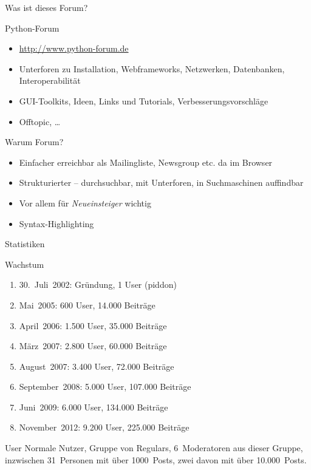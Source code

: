 \documentclass{beamer}
\begin{document}
\begin{frame}{Was ist dieses Forum?}
  \begin{block}{Python-Forum}
    \begin{itemize}
      \item \url{http://www.python-forum.de}
      \item Unterforen zu Installation, Webframeworks, Netzwerken, Datenbanken,
	Interoperabilität
      \item GUI-Toolkits, Ideen, Links und Tutorials, Verbesserungsvorschläge
      \item Offtopic, …
    \end{itemize}
  \end{block}
  \begin{block}{Warum Forum?}
    \begin{itemize}
      \item Einfacher erreichbar als Mailingliste, Newsgroup etc. da im Browser
      \item Strukturierter – durchsuchbar, mit Unterforen, in Suchmaschinen auffindbar
      \item Vor allem für \emph{Neueinsteiger} wichtig
      \item Syntax-Highlighting 
    \end{itemize}
  \end{block}
\end{frame}

\begin{frame}{Statistiken}
  \begin{block}{Wachstum}
    \begin{enumerate}
      \item 30.~Juli~2002: Gründung, 1 User (piddon)
      \item Mai~2005: 600 User, 14.000 Beiträge
      \item April~2006: 1.500 User, 35.000 Beiträge
      \item März~2007: 2.800 User, 60.000 Beiträge
      \item August~2007: 3.400 User, 72.000 Beiträge
      \item September~2008: 5.000 User, 107.000 Beiträge
      \item Juni~2009: 6.000 User, 134.000 Beiträge
      \item November~2012: 9.200 User, 225.000 Beiträge
    \end{enumerate}
  \end{block}
  \begin{block}{User}
    Normale Nutzer, Gruppe von Regulars, 6~Moderatoren aus dieser Gruppe,
    inzwischen 31~Personen mit über 1000~Posts, zwei davon mit über
    10.000~Posts.
  \end{block}
\end{frame}
\end{document}
